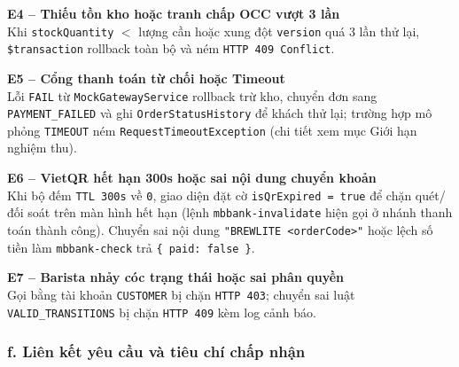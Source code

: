 \documentclass[12pt,a4paper]{report}
\begin{document}
\medskip
\noindent\textbf{E4 -- Thiếu tồn kho hoặc tranh chấp OCC vượt 3 lần} \\
Khi \texttt{stockQuantity} $<$ lượng cần hoặc xung đột \texttt{version} quá 3 lần thử lại, \texttt{\$transaction} rollback toàn bộ và ném \texttt{HTTP 409 Conflict}.

\medskip
\noindent\textbf{E5 -- Cổng thanh toán từ chối hoặc Timeout} \\
Lỗi \texttt{FAIL} từ \texttt{MockGatewayService} rollback trừ kho, chuyển đơn sang \texttt{PAYMENT\_FAILED} và ghi \texttt{OrderStatusHistory} để khách thử lại; trường hợp mô phỏng \texttt{TIMEOUT} ném \texttt{RequestTimeoutException} (chi tiết xem mục Giới hạn nghiệm thu).

\medskip
\noindent\textbf{E6 -- VietQR hết hạn 300s hoặc sai nội dung chuyển khoản} \\
Khi bộ đếm \texttt{TTL 300s} về \texttt{0}, giao diện đặt cờ \texttt{isQrExpired = true} để chặn quét/đối soát trên màn hình hết hạn (lệnh \texttt{mbbank-invalidate} hiện gọi ở nhánh thanh toán thành công). Chuyển sai nội dung \texttt{"BREWLITE <orderCode>"} hoặc lệch số tiền làm \texttt{mbbank-check} trả \texttt{\{ paid: false \}}.

\medskip
\noindent\textbf{E7 -- Barista nhảy cóc trạng thái hoặc sai phân quyền} \\
Gọi  bằng tài khoản \texttt{CUSTOMER} bị chặn \texttt{HTTP 403}; chuyển sai luật \texttt{VALID\_TRANSITIONS} bị chặn \texttt{HTTP 409} kèm log cảnh báo.

\subsubsection*{f. Liên kết yêu cầu và tiêu chí chấp nhận}
\end{document}
